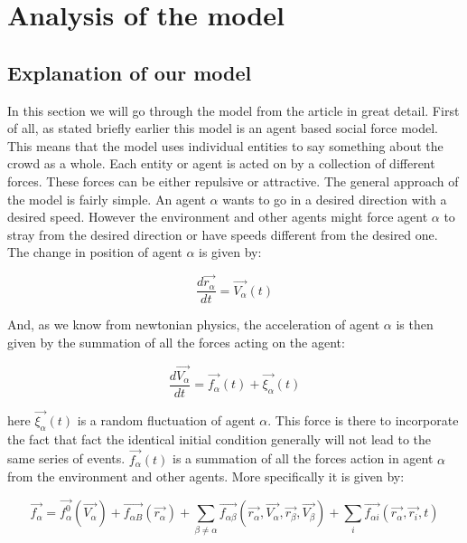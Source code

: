 \section{Analysis of the model}

\subsection{Explanation of our model}
In this section we will go through the model from the article \cite{self-org} in great detail. 
First of all,  as stated briefly earlier this model is an agent based social force model. 
This means that the model uses individual entities to say something about the crowd as a whole. 
Each entity or agent is acted on by a collection of different forces. These forces can be
either repulsive or attractive. The general approach of the model is fairly simple. An agent
$\alpha$ wants to go in a desired direction with a desired speed. However the environment 
and other agents might force agent $\alpha$ to stray from the desired direction or have speeds 
different from the desired one. The change in position of agent $\alpha$ is given by:

	\begin{equation}
		\frac{d \vec{r_{\alpha}}}{dt} = \vec{V_{\alpha}} \left( t \right)
	\end{equation}

And, as we know from newtonian physics, the acceleration of agent $\alpha$ is 
then given by the summation of all the forces acting on the agent:

\begin{equation}
    \frac{d \vec{V_{\alpha}}}{dt} = \vec{f_{\alpha}} \left( t \right) + 
    \vec{\xi_{\alpha}}\left( t \right)
\end{equation}

here $\vec{\xi_{\alpha}} \left( t \right)$ is a random fluctuation of agent $\alpha$. This
force is there to incorporate the fact that fact the identical initial condition
generally will not lead to the same series of events. $\vec{f_{\alpha}} \left( t \right)$ 
is a summation of all the forces action in agent $\alpha$ from the environment 
and other agents. More specifically it is given by:

\begin{equation}\label{model}
    \vec{f_{\alpha}} = \vec{f^{0}_{\alpha}}\left( \vec{V_{\alpha}} \right) + 
    \vec{f_{\alpha B}} \left( \vec{r_{\alpha}} \right) +
    \sum_{\beta \neq \alpha} \vec{f_{\alpha \beta}} \left(\vec{r_{\alpha}}, 
    \vec{V_{\alpha}}, \vec{r_{\beta}}, \vec{V_{\beta}} \right) +
    \sum_{i} \vec{f_{\alpha i}} \left( \vec{r_{\alpha}}, \vec{r_{i}}, t 
    \right)
\end{equation}

